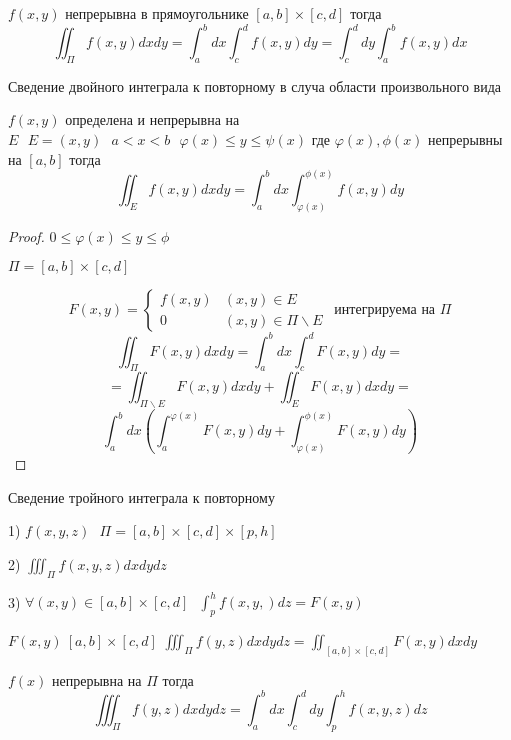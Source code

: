 \begin{block}[Следствие]
  $f(x,y)$ непрерывна в прямоугольнике $[a,b] \times [c,d]$ тогда
  $$
  \iint_{\Pi} f(x,y) dxdy = \int_a^b dx \int_c^d f(x,y) dy =
  \int_c^d dy \int_a^b f(x,y) dx
  $$
\end{block}

\begin{title}[\Large]
  Сведение двойного интеграла к повторному в случа области произвольного вида
\end{title}

\begin{theorem}
  $f(x,y)$ определена и непрерывна на $E ~~~ E = (x,y) ~~~ a < x < b ~~~
  \varphi(x) \le y \le \psi(x)$ где $\varphi(x), \phi(x)$ непрерывны на
  $[a,b]$ тогда
  $$
  \iint_E f(x,y)dxdy = \int_a^b dx \int_{\varphi(x)}^{\phi(x)} f(x,y)dy
  $$
\end{theorem}

\begin{proof}
  $0 \le \varphi(x) \le y \le \phi$

  $\Pi = [a,b] \times [c,d]$

  $$
  F(x,y) =
  \left\{
  \begin{array}{cc}
    f(x,y) &(x,y) \in E \\
    0 & (x,y) \in \Pi \backslash E
  \end{array}
  \right. ~~ \text{интегрируема на $\Pi$}
  $$
  $$
  \iint_{\Pi} F(x,y) dxdy = \int_a^b dx \int_c^d F(x,y) dy =
  $$
  $$
  = \iint_{\Pi \backslash E} F(x,y) dxdy + \iint_E F(x,y)dxdy =
  $$
  $$
  \int_a^b dx \left( \int_a^{\varphi(x)} F(x, y) dy +
  \int_{\varphi(x)}^{\phi(x)} F(x, y) dy \right)
  $$
\end{proof}

\begin{title}[\Large]
  Сведение тройного интеграла к повторному
\end{title}

\begin{theorem}
  1) $f(x,y,z) ~~~ \Pi = [a,b] \times [c,d] \times [p,h]$

  2) $\iiint_{\Pi} f(x,y,z) dx dy dz$

  3) $\forall (x,y) \in [a,b] \times [c,d] ~~~ \int_p^h f(x,y,)dz = F(x,y)$

  $F(x,y) ~ [a,b] \times [c,d]$
  $\iiint_{\Pi} f(y,z) dxdydz = \iint_{[a,b] \times [c,d]} F(x,y) dxdy$

  $f(x)$ непрерывна на $\Pi$ тогда
  $$
  \iiint_{\Pi} f(y,z) dxdydz = \int_a^b dx \int_c^d dy \int_p^h f(x,y,z) dz
  $$
\end{theorem}


